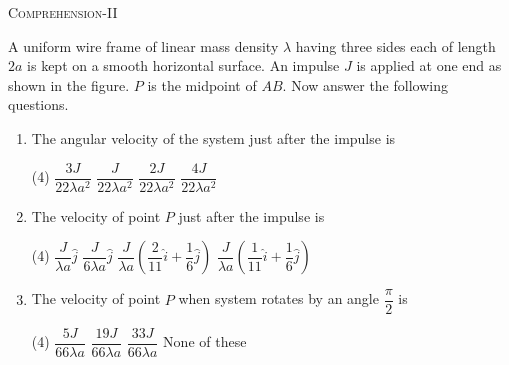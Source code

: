 \begin{center}
    \textsc{Comprehension-II}
\end{center}
A uniform wire frame of linear mass density $\lambda$ having three sides each of length $2a$ is kept on a smooth horizontal surface. An impulse $J$ is applied at one end as shown in the figure. $P$ is the midpoint of $AB$. Now answer the following questions. 
\begin{center}
\end{center} 
\begin{enumerate}
    \item The angular velocity of the system just after the impulse is
        \begin{tasks}(4)
            \task $\dfrac{3J}{22\lambda a^2}$\ans
            \task $\dfrac{J}{22\lambda a^2}$
            \task $\dfrac{2J}{22\lambda a^2}$
            \task $\dfrac{4J}{22\lambda a^2}$
        \end{tasks}

    \item The velocity of point $P$ just after the impulse is
        \begin{tasks}(4)
            \task $\dfrac{J}{\lambda a}\hat{j}$
            \task $\dfrac{J}{6\lambda a}\hat{j}$
            \task $\dfrac{J}{\lambda a}\left(\dfrac{2}{11}\hat{i} + \dfrac{1}{6}\hat{j}\right)$
            \task $\dfrac{J}{\lambda a}\left(\dfrac{1}{11}\hat{i} + \dfrac{1}{6}\hat{j}\right)$\ans
        \end{tasks}

    \item The velocity of point $P$ when system rotates by an angle $\dfrac{\pi}{2}$ is
        \begin{tasks}(4)
            \task $\dfrac{5J}{66\lambda a}$\ans
            \task $\dfrac{19J}{66\lambda a}$
            \task $\dfrac{33J}{66\lambda a}$
            \task None of these
        \end{tasks} 
\end{enumerate}
